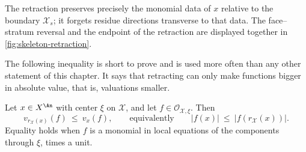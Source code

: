 The retraction preserves precisely the monomial data of $x$ relative to
the boundary $\mathcal X_s$; it forgets residue directions transverse to
that data.  The face--stratum reversal and the endpoint of the retraction are
displayed together in \cref{fig:skeleton-retraction}.

The following inequality is short to prove and is used more often than any
other statement of this chapter. It says that retracting can only make
functions bigger in absolute value, that is, valuations smaller.

\begin{lemma}
\label{lem:retraction-minorant}
Let $x\in X^{\An}$ with center $\xi$ on $\mathcal X$, and let
$f\in\mathcal O_{\mathcal X,\xi}$. Then
\[
 v_{r_{\mathcal X}(x)}(f)\ \le\ v_x(f),
 \qquad\text{equivalently}\qquad
 |f(x)|\ \le\ |f(r_{\mathcal X}(x))| .
\]
Equality holds when $f$ is a monomial in local equations of the components
through $\xi$, times a unit.
\end{lemma}

